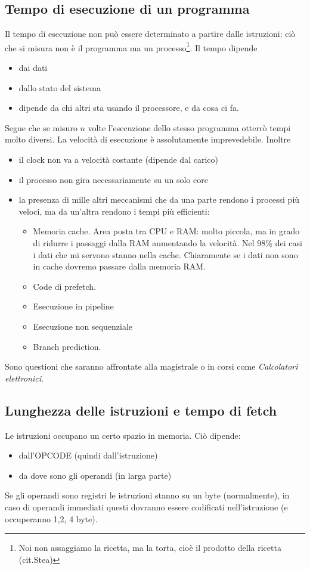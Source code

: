 \documentclass[11pt]{report}
\begin{document}
\subsection{Tempo di esecuzione di un programma}
Il tempo di esecuzione non può essere determinato a partire dalle istruzioni: ciò che si misura non è il programma ma un processo\footnote{Noi non assaggiamo la ricetta, ma la torta, cioè il prodotto della ricetta (cit.Stea)}. Il tempo dipende
\begin{itemize}
\item dai dati
\item dallo stato del sistema
\item dipende da chi altri sta usando il processore, e da cosa ci fa.
\end{itemize}
Segue che se misuro $n$ volte l'esecuzione dello stesso programma otterrò tempi molto diversi. La velocità di esecuzione è assolutamente imprevedebile. Inoltre
\begin{itemize}
\item il clock non va a velocità costante (dipende dal carico)
\item il processo non gira necessariamente su un solo core
\item la presenza di mille altri meccanismi che da una parte rendono i processi più veloci, ma da un'altra rendono i tempi più efficienti:
\begin{itemize}
\item Memoria cache. Area posta tra CPU e RAM: molto piccola, ma in grado di ridurre i passaggi dalla RAM aumentando la velocità. Nel 98\% dei casi i dati che mi servono stanno nella cache. Chiaramente se i dati non sono in cache dovremo passare dalla memoria RAM.
\item Code di prefetch. 
\item Esecuzione in pipeline
\item Esecuzione non sequenziale
\item Branch prediction. 
\end{itemize}
\end{itemize}
Sono questioni che saranno affrontate alla magistrale o in corsi come \emph{Calcolatori elettronici}.
\subsection{Lunghezza delle istruzioni e tempo di fetch}
Le istruzioni occupano un certo spazio in memoria. Ciò dipende:
\begin{itemize}
\item dall'OPCODE (quindi dall'istruzione)
\item da dove sono gli operandi (in larga parte)
\end{itemize}
Se gli operandi sono registri le istruzioni stanno su un byte (normalmente), in caso di operandi immediati questi dovranno essere codificati nell'istruzione (e occuperanno 1,2, 4 byte).
\end{document}
